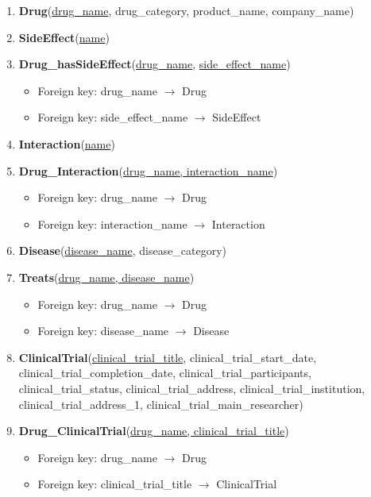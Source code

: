 \documentclass[12pt,a4paper]{article}
\begin{document}
\begin{enumerate}
    \item \textbf{Drug}(\underline{drug\_name}, drug\_category, product\_name, company\_name)
    
    \item \textbf{SideEffect}(\underline{name})
    
    \item \textbf{Drug\_hasSideEffect}(\underline{drug\_name}, \underline{side\_effect\_name})
    \begin{itemize}
        \item Foreign key: drug\_name $\longrightarrow$ Drug
        \item Foreign key: side\_effect\_name $\longrightarrow$ SideEffect
    \end{itemize}
    
    \item \textbf{Interaction}(\underline{name})
    
    \item \textbf{Drug\_Interaction}(\underline{drug\_name, interaction\_name})
    \begin{itemize}
        \item Foreign key: drug\_name $\longrightarrow$ Drug
        \item Foreign key: interaction\_name $\longrightarrow$ Interaction
    \end{itemize}
    
    \item \textbf{Disease}(\underline{disease\_name}, disease\_category)
    
    \item \textbf{Treats}(\underline{drug\_name, disease\_name})
    \begin{itemize}
        \item Foreign key: drug\_name $\longrightarrow$ Drug
        \item Foreign key: disease\_name $\longrightarrow$ Disease
    \end{itemize}
    
    \item \textbf{ClinicalTrial}(\underline{clinical\_trial\_title}, clinical\_trial\_start\_date, clinical\_trial\_completion\_date, clinical\_trial\_participants, clinical\_trial\_status, clinical\_trial\_address, clinical\_trial\_institution, clinical\_trial\_address\_1, clinical\_trial\_main\_researcher)
    
    \item \textbf{Drug\_ClinicalTrial}(\underline{drug\_name, clinical\_trial\_title})
    \begin{itemize}
        \item Foreign key: drug\_name $\longrightarrow$ Drug
        \item Foreign key: clinical\_trial\_title $\longrightarrow$ ClinicalTrial
    \end{itemize}
    
\end{enumerate}
\\
\end{document}
